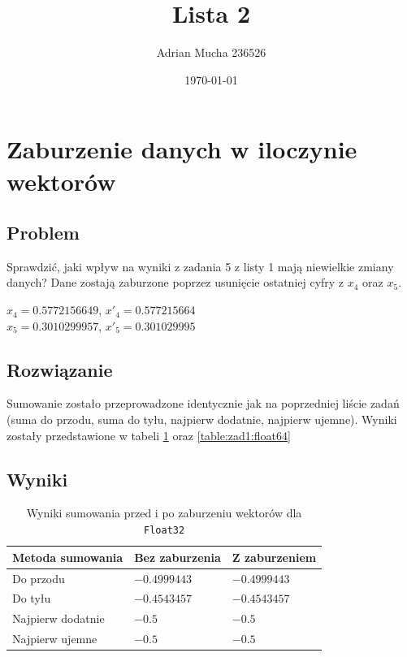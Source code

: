 \documentclass{article}
\title{Lista 2}
\author{Adrian Mucha 236526}
\date{\today}
\begin{document}
\maketitle

\section{Zaburzenie danych w iloczynie wektorów}
    \subsection{Problem}
        Sprawdzić, jaki wpływ na wyniki z zadania 5 z listy 1 mają niewielkie zmiany danych?
        Dane zostają zaburzone poprzez usunięcie ostatniej cyfry z $x_4$ oraz $x_5$.
        \begin{center}
            $x_4 = 0.5772156649$, $x'_4 = 0.577215664$ \\
            $x_5 = 0.3010299957$, $x'_5 = 0.301029995$
        \end{center}
    \subsection{Rozwiązanie}
        Sumowanie zostało przeprowadzone identycznie jak na poprzedniej liście zadań (suma do przodu, suma do tyłu, najpierw dodatnie, najpierw ujemne). Wyniki zostały przedstawione w tabeli \ref{table:zad1:float32} oraz \ref{table:zad1:float64}
    \subsection{Wyniki}
        {\small
        \begin{table}[h!]
        \centering
        \begin{tabular}{l l l}
            \hline
             Metoda sumowania & Bez zaburzenia & Z zaburzeniem \\
             \hline
            Do przodu & $-0.4999443$ & $-0.4999443$ \\
            Do tyłu & $-0.4543457$ & $-0.4543457$ \\
            Najpierw dodatnie & $-0.5$ & $-0.5$ \\
            Najpierw ujemne & $-0.5$ & $-0.5$ \\
            \hline
        \end{tabular}
        \caption{Wyniki sumowania przed i po zaburzeniu wektorów dla \texttt{Float32}}
        \label{table:zad1:float32}
        \end{table}
        }
        
\end{document}
